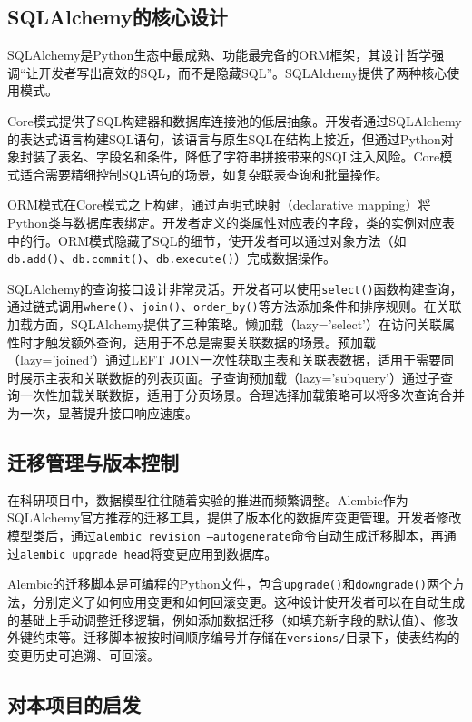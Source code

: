 \documentclass[12pt,a4paper]{ctexart}
\begin{document}
\subsection{SQLAlchemy的核心设计}

SQLAlchemy是Python生态中最成熟、功能最完备的ORM框架，其设计哲学强调“让开发者写出高效的SQL，而不是隐藏SQL”。SQLAlchemy提供了两种核心使用模式。

Core模式提供了SQL构建器和数据库连接池的低层抽象。开发者通过SQLAlchemy的表达式语言构建SQL语句，该语言与原生SQL在结构上接近，但通过Python对象封装了表名、字段名和条件，降低了字符串拼接带来的SQL注入风险。Core模式适合需要精细控制SQL语句的场景，如复杂联表查询和批量操作。

ORM模式在Core模式之上构建，通过声明式映射（declarative mapping）将Python类与数据库表绑定。开发者定义的类属性对应表的字段，类的实例对应表中的行。ORM模式隐藏了SQL的细节，使开发者可以通过对象方法（如\texttt{db.add()}、\texttt{db.commit()}、\texttt{db.execute()}）完成数据操作。

SQLAlchemy的查询接口设计非常灵活。开发者可以使用\texttt{select()}函数构建查询，通过链式调用\texttt{where()}、\texttt{join()}、\texttt{order\_by()}等方法添加条件和排序规则。在关联加载方面，SQLAlchemy提供了三种策略。懒加载（lazy='select'）在访问关联属性时才触发额外查询，适用于不总是需要关联数据的场景。预加载（lazy='joined'）通过LEFT JOIN一次性获取主表和关联表数据，适用于需要同时展示主表和关联数据的列表页面。子查询预加载（lazy='subquery'）通过子查询一次性加载关联数据，适用于分页场景。合理选择加载策略可以将多次查询合并为一次，显著提升接口响应速度。

\subsection{迁移管理与版本控制}

在科研项目中，数据模型往往随着实验的推进而频繁调整。Alembic作为SQLAlchemy官方推荐的迁移工具，提供了版本化的数据库变更管理。开发者修改模型类后，通过\texttt{alembic revision --autogenerate}命令自动生成迁移脚本，再通过\texttt{alembic upgrade head}将变更应用到数据库。

Alembic的迁移脚本是可编程的Python文件，包含\texttt{upgrade()}和\texttt{downgrade()}两个方法，分别定义了如何应用变更和如何回滚变更。这种设计使开发者可以在自动生成的基础上手动调整迁移逻辑，例如添加数据迁移（如填充新字段的默认值）、修改外键约束等。迁移脚本被按时间顺序编号并存储在\texttt{versions/}目录下，使表结构的变更历史可追溯、可回滚。

\subsection{对本项目的启发}
\end{document}

